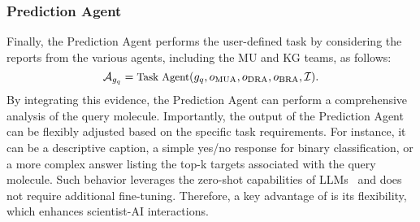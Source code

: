 \subsubsection{Prediction Agent}
\label{sec:PredictionAgent}
Finally, the Prediction Agent performs the user-defined task by considering the reports from the various agents, including the MU and KG teams, %
as follows:
\begin{equation}
\small
    \mathcal{A}_{g_q} = \text{Task Agent}(g_q, o_{\text{MUA}}, o_{\text{DRA}}, o_{\text{BRA}}, \mathcal{I}).
    \vspace{-5pt}
\end{equation}
By integrating this evidence, the Prediction Agent can perform a comprehensive analysis of the query molecule. Importantly, the output of the Prediction Agent can be flexibly adjusted based on the specific task requirements. For instance, it can be a descriptive caption, a simple yes/no response for binary classification, or a more complex answer listing the top-k targets associated with the query molecule. Such behavior leverages the zero-shot capabilities of LLMs~\cite{kojima2022large} and does not require additional fine-tuning.
Therefore, a key advantage of \proposed is its flexibility, which enhances scientist-AI interactions. 
